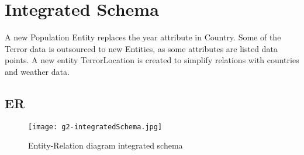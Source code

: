 \section{Integrated Schema}
A new Population Entity replaces the year attribute in Country. Some of the Terror data is outsourced to new Entities, as some attributes are listed data points. A new entity TerrorLocation is created to simplify relations with countries and weather data.

\subsection{ER}
\begin{figure}[hbt!]
	\centering
	\texttt{[image: g2-integratedSchema.jpg]}
	\caption{Entity-Relation diagram integrated schema}
\end{figure}
    
